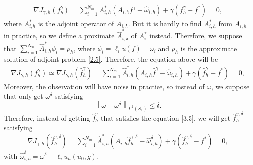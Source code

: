 \documentclass[]{article}
\begin{document}
\begin{align}\label{3.3}
	\nabla J_{\gamma, h}(f^\gamma_h)= \sum_{i=1}^{N_m}A_{i, h}^*(A_{i, h}f^\gamma-\hat{\omega}_{i, h})+\gamma(f^\gamma_h-f^*)=0,
\end{align}
where $A_{i, h}^*$ is the adjoint operator of $A_{i, h}$. But it is hardly to find $A^*_{i, h}$ from $A_{i, h}$ in practice, so we define a proximate $\hat{A}_{i, h}^*$ of $A_i^*$ instead. Therefore, we suppose that $\sum_{i=1}^{N_m}\hat{A}^*_{i, h}\phi_i=p_h$, where $\phi_i=\ell_i u(f) - \omega_i$ and $p_h$ is the approximate solution of adjoint problem \eqref{2.5}. Therefore, the equation above will be
\begin{align}\label{3.4}
	\nabla J_{\gamma, h}(f^\gamma_h)\simeq\nabla J_{\gamma, h}(\hat{f}^\gamma_h)= \sum_{i=1}^{N_m}\hat{A}_{i, h}^*(A_{i, h}\hat{f}^\gamma-\hat{\omega}_{i, h})+\gamma(\hat{f}^\gamma_h-f^*)=0,
\end{align}
Moreover, the observation will have noise in practice, so instead of $\omega$, we suppose that only get $\omega^{\delta}$ satisfying
$$\left\| \omega-\omega^\delta\right\|_{L^2(S_1)}\leq \delta.$$
Therefore, instead of getting $\hat{f}^\gamma_h$ that satisfies the equation \eqref{3.5}, we will get $\hat{f}^{\gamma, \delta}_h$ satisfying
\begin{align}\label{3.5}
	\nabla J_{\gamma, h}\left(\hat{f}^{\gamma, \delta}_h\right)= \sum_{i=1}^{N_m}\hat{A}_{i, h}^*(A_{i, h}\hat{f}^{\gamma, \delta}_h-\hat{\omega}_{i, h}^\delta)+\gamma(\hat{f}^{\gamma, \delta}_h-f^*)=0,
\end{align}
with $\hat{\omega}_{i, h}^\delta=\omega^\delta-\ell_i u_h(u_0, g)$.
\end{document}
